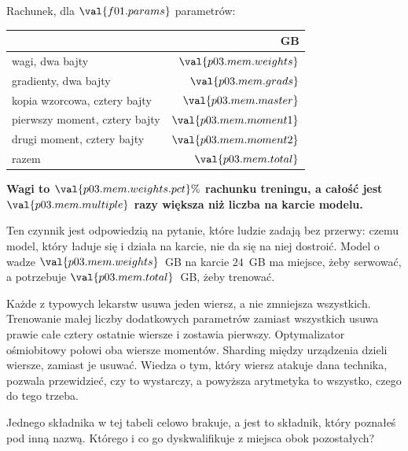 \begin{fr}
Rachunek, dla $\val{f01.params}$ parametrów:

\begin{center}
\begin{tabular}{lr}
\toprule
 & GB \\
\midrule
wagi, dwa bajty & $\val{p03.mem.weights}$ \\
gradienty, dwa bajty & $\val{p03.mem.grads}$ \\
kopia wzorcowa, cztery bajty & $\val{p03.mem.master}$ \\
pierwszy moment, cztery bajty & $\val{p03.mem.moment1}$ \\
drugi moment, cztery bajty & $\val{p03.mem.moment2}$ \\
\midrule
razem & $\val{p03.mem.total}$ \\
\bottomrule
\end{tabular}
\end{center}

\textbf{Wagi to $\val{p03.mem.weights.pct}\%$ rachunku treningu, a całość jest
$\val{p03.mem.multiple}$ razy większa niż liczba na karcie modelu.}

\begin{aibox}
Ten czynnik jest odpowiedzią na pytanie, które ludzie zadają bez przerwy:
czemu model, który ładuje się i działa na karcie, nie da się na niej dostroić.
Model o wadze $\val{p03.mem.weights}$~GB na karcie $24$~GB ma miejsce, żeby
serwować, a potrzebuje $\val{p03.mem.total}$~GB, żeby trenować.

Każde z typowych lekarstw usuwa jeden wiersz, a nie zmniejsza wszystkich.
Trenowanie małej liczby dodatkowych parametrów zamiast wszystkich usuwa prawie
całe cztery ostatnie wiersze i zostawia pierwszy. Optymalizator ośmiobitowy
połowi oba wiersze momentów. Sharding między urządzenia dzieli wiersze, zamiast
je usuwać. Wiedza o tym, który wiersz atakuje dana technika, pozwala
przewidzieć, czy to wystarczy, a powyższa arytmetyka to wszystko, czego do tego
trzeba.
\end{aibox}

Jednego składnika w tej tabeli celowo brakuje, a jest to składnik, który
poznałeś pod inną nazwą. Którego i co go dyskwalifikuje z miejsca obok
pozostałych?
\dotline
\nextframe
\end{fr}

